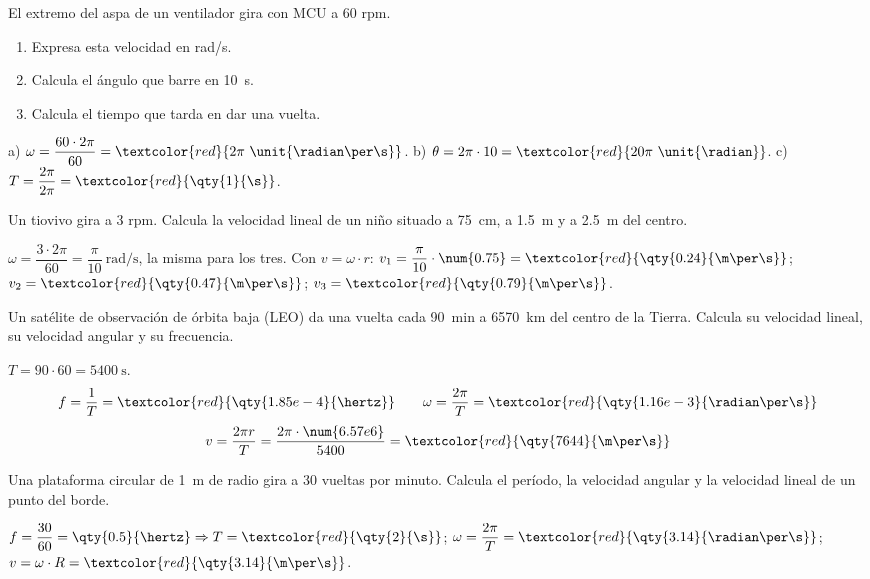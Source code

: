 \begin{exercise}
    El extremo del aspa de un ventilador gira con MCU a 60 rpm.
    \begin{enumerate}[label=\alph*)]
        \item Expresa esta velocidad en rad/s.
        \item Calcula el ángulo que barre en \qty{10}{\s}.
        \item Calcula el tiempo que tarda en dar una vuelta.
    \end{enumerate}
    \begin{solu}
        a) \(\omega = \dfrac{60 \cdot 2\pi}{60} = \textcolor{red}{2\pi~\unit{\radian\per\s}}\). b) \(\theta = 2\pi \cdot 10 = \textcolor{red}{20\pi~\unit{\radian}}\). c) \(T = \dfrac{2\pi}{2\pi} = \textcolor{red}{\qty{1}{\s}}\).
    \end{solu}
\end{exercise}

\begin{exercise}
    Un tiovivo gira a 3 rpm. Calcula la velocidad lineal de un niño situado a \qty{75}{\cm}, a \qty{1.5}{\m} y a \qty{2.5}{\m} del centro.
    \begin{solu}
        \(\omega = \dfrac{3 \cdot 2\pi}{60} = \dfrac{\pi}{10}~\unit{\radian\per\s}\), la misma para los tres. Con \(v = \omega \cdot r\):
        \(v_1 = \dfrac{\pi}{10} \cdot \num{0.75} = \textcolor{red}{\qty{0.24}{\m\per\s}}\); \(v_2 = \textcolor{red}{\qty{0.47}{\m\per\s}}\); \(v_3 = \textcolor{red}{\qty{0.79}{\m\per\s}}\).
    \end{solu}
\end{exercise}

\begin{exercise}
    Un satélite de observación de órbita baja (LEO) da una vuelta cada \qty{90}{\minute} a \qty{6570}{\km} del centro de la Tierra. Calcula su velocidad lineal, su velocidad angular y su frecuencia.
    \begin{solu}
        \(T = 90 \cdot 60 = \qty{5400}{\s}\).
        \[ f = \frac{1}{T} = \textcolor{red}{\qty{1.85e-4}{\hertz}} \qquad \omega = \frac{2\pi}{T} = \textcolor{red}{\qty{1.16e-3}{\radian\per\s}} \]
        \[ v = \frac{2\pi r}{T} = \frac{2\pi \cdot \num{6.57e6}}{5400} = \textcolor{red}{\qty{7644}{\m\per\s}} \]
    \end{solu}
\end{exercise}

\begin{exercise}
    Una plataforma circular de \qty{1}{\m} de radio gira a 30 vueltas por minuto. Calcula el período, la velocidad angular y la velocidad lineal de un punto del borde.
    \begin{solu}
        \(f = \dfrac{30}{60} = \qty{0.5}{\hertz} \Rightarrow T = \textcolor{red}{\qty{2}{\s}}\); \(\omega = \dfrac{2\pi}{T} = \textcolor{red}{\qty{3.14}{\radian\per\s}}\); \(v = \omega \cdot R = \textcolor{red}{\qty{3.14}{\m\per\s}}\).
    \end{solu}
\end{exercise}

